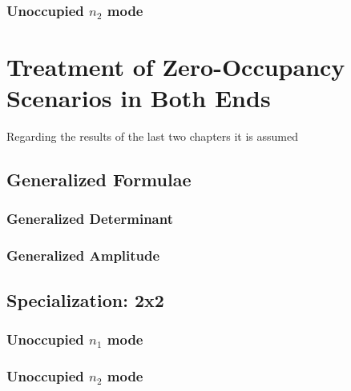 \documentclass[
	english,
	a4paper,
	fontsize=10pt,
	parskip=half,
	titlepage=true,
	DIV=12,
	final
]{scrreprt}
\begin{document}
\subsection{Unoccupied $n_2$ mode}


\chapter{Treatment of Zero-Occupancy Scenarios in Both Ends}
Regarding the results of the last two chapters it is assumed
\section{Generalized Formulae}
\subsection{Generalized Determinant}
\subsection{Generalized Amplitude}

\section{Specialization: 2x2}
\subsection{Unoccupied $n_1$ mode}
\subsection{Unoccupied $n_2$ mode}
\end{document}

